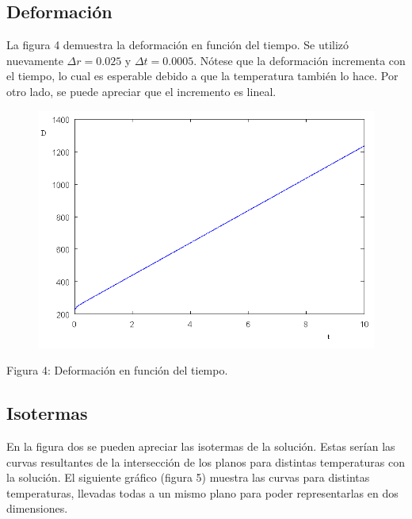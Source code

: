 ﻿\documentclass[%
final,
%
reprint,
%
notitlepage,
narroweqnarray,
inline,
twoside,
invited
]{ieee}
\begin{document}
\subsection{Deformación}

La figura 4 demuestra la deformación en función del tiempo. Se utilizó nuevamente $\Delta r = 0.025$ 
y $\Delta t = 0.0005$. Nótese que la deformación incrementa con el tiempo, lo cual es esperable debido a 
que la temperatura también lo hace. Por otro lado, se puede apreciar que el incremento es lineal.

\begin{figure}[H]
	\begin{center}
	\includegraphics[scale=0.4]{./img/deformacion.png}
	\end{center}
\end{figure}
\begin{center}
\par Figura 4: Deformación en función del tiempo.
\end{center}

\subsection{Isotermas}

En la figura dos se pueden apreciar las isotermas de la solución. Estas serían las curvas resultantes de 
la intersección de los planos para distintas temperaturas con la solución. El siguiente gráfico (figura 5) muestra 
las curvas para distintas temperaturas, llevadas todas a un mismo plano para poder representarlas en dos dimensiones.
\end{document}
